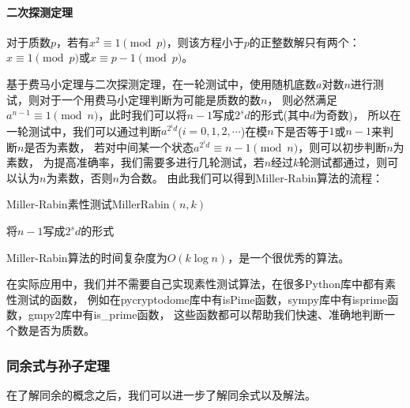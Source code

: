 \documentclass{article}
\numberwithin{equation}{subsubsection}
\begin{document}
\paragraph{\textbf{二次探测定理}}
对于质数$p$，若有$x^2\equiv 1\pmod{p}$，则该方程小于$p$的正整数解只有两个：$x\equiv 1\pmod{p}$或$x\equiv p-1\pmod{p}$。\par
基于费马小定理与二次探测定理，在一轮测试中，使用随机底数$a$对数$n$进行测试，则对于一个用费马小定理判断为可能是质数的数$n$，
则必然满足$a^{n-1}\equiv 1\pmod{n}$，此时我们可以将$n-1$写成$2^sd$的形式(其中$d$为奇数)，
所以在一轮测试中，我们可以通过判断$a^{2^{i}d}$($i=0,1,2,\cdots $)在模$n$下是否等于$1$或$n-1$来判断$n$是否为素数，
若对中间某一个状态$a^{2^{i}d}\equiv n-1\pmod{n}$，则可以初步判断$n$为素数，
为提高准确率，我们需要多进行几轮测试，若$n$经过$k$轮测试都通过，则可以认为$n$为素数，否则$n$为合数。
由此我们可以得到Miller-Rabin算法的流程：
\begin{algorithm}
    \caption{Miller-Rabin素性测试$\text{MillerRabin}(n,k)$}
    将$n-1$写成$2^sd$的形式\\
\end{algorithm}\par
Miller-Rabin算法的时间复杂度为$O(k\log{n})$，是一个很优秀的算法。\par
在实际应用中，我们并不需要自己实现素性测试算法，在很多Python库中都有素性测试的函数，
例如在pycryptodome库中有isPime函数，sympy库中有isprime函数，gmpy2库中有is\_prime函数，
这些函数都可以帮助我们快速、准确地判断一个数是否为质数。

\subsubsection{同余式与孙子定理}
在了解同余的概念之后，我们可以进一步了解同余式以及解法。\par
\end{document}
